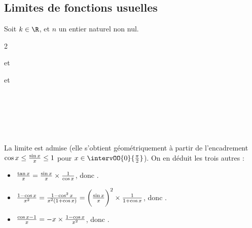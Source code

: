\subsection{Limites de fonctions usuelles}
Soit $k\in \R$, et $n$ un entier naturel non nul.
\begin{boite}
	\begin{multicols}{2}
		\item[$\bullet$]  et 
		\item[$\bullet$] 
		\item[$\bullet$] 
		\item[$\bullet$] 
		\item[$\bullet$]  et  
		\item[$\bullet$] \\ \item[$\bullet$]\\
		\item[$\bullet$] \\
		\item[$\bullet$] 
	\end{multicols}
\end{boite}
\begin{preuve}
La limite  est admise (elle s'obtient géométriquement à partir de l'encadrement $\cos x\leq \frac{\sin x}{x}\leq 1$ pour $x\in\intervOO{0}{\f{\pi}{2}}$). On en déduit les trois autres :
\begin{itemize}
	\item $\frac{\tan x}{x}=\frac{\sin x}{x}\times\frac{1}{\cos x}$, donc .
	\item $\frac{1-\cos x}{x^2}=\frac{1-\cos^2 x}{x^2(1+\cos x)}=\bigg(\frac{\sin x}{x}\bigg)^2\times\frac{1}{1+\cos x}$, donc .
	\item $\frac{\cos x-1}{x}=-x\times\frac{1-\cos x}{x^2}$, donc .
\end{itemize}
\end{preuve}
